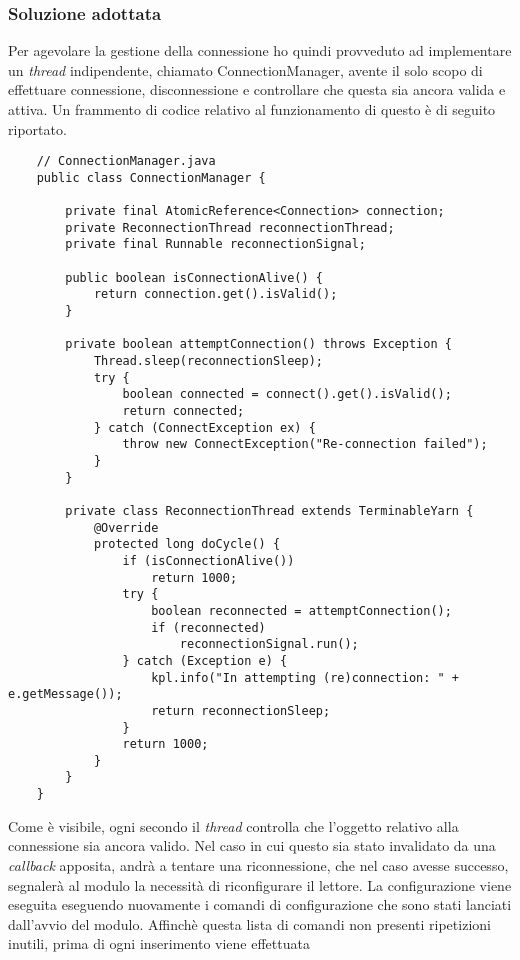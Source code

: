 \subsubsection*{Soluzione adottata}
Per agevolare la gestione della connessione ho quindi provveduto ad implementare un \emph{thread} indipendente,
chiamato ConnectionManager, avente il solo scopo di effettuare connessione, disconnessione e controllare che questa sia ancora valida e attiva.
Un frammento di codice relativo al funzionamento di questo è di seguito riportato. 
\begin{lstlisting}
    // ConnectionManager.java
    public class ConnectionManager {

        private final AtomicReference<Connection> connection;
        private ReconnectionThread reconnectionThread;
        private final Runnable reconnectionSignal;

        public boolean isConnectionAlive() {
		    return connection.get().isValid();
	    }

        private boolean attemptConnection() throws Exception {
		    Thread.sleep(reconnectionSleep);
		    try {
			    boolean connected = connect().get().isValid();
			    return connected;
		    } catch (ConnectException ex) {
			    throw new ConnectException("Re-connection failed");
		    }
	    }

        private class ReconnectionThread extends TerminableYarn {
            @Override
            protected long doCycle() {
                if (isConnectionAlive())
                    return 1000;
                try {
                    boolean reconnected = attemptConnection();
                    if (reconnected)
                        reconnectionSignal.run();
                } catch (Exception e) {
                    kpl.info("In attempting (re)connection: " + e.getMessage());
                    return reconnectionSleep;
                }
                return 1000;
            }
	    }
	}
\end{lstlisting}
Come è visibile, ogni secondo il \emph{thread} controlla che l'oggetto relativo alla connessione sia ancora valido.
Nel caso in cui questo sia stato invalidato da una \emph{callback} apposita, andrà a tentare una riconnessione, che
nel caso avesse successo, segnalerà al modulo la necessità di riconfigurare il lettore.
La configurazione viene eseguita eseguendo nuovamente i comandi di configurazione che sono stati lanciati dall'avvio
del modulo. Affinchè questa lista di comandi non presenti ripetizioni inutili, prima di ogni inserimento viene effettuata
